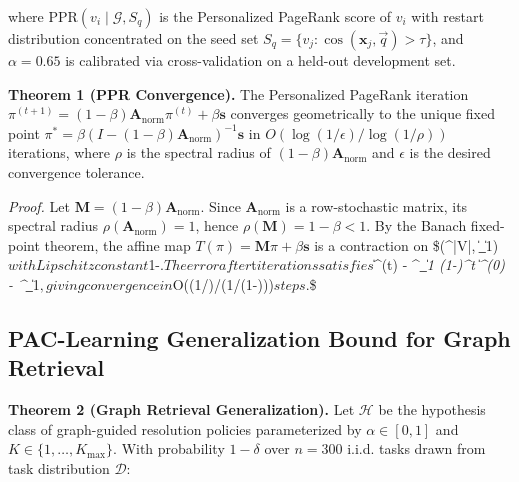\documentclass[10pt,journal,compsoc,twocolumn]{IEEEtran}
\begin{document}
where $\text{PPR}(v_i \mid \mathcal{G}, S_q)$ is the Personalized PageRank score of $v_i$ with restart distribution concentrated on the seed set $S_q = \{v_j : \cos(\mathbf{x}_j, \vec{q}) > \tau\}$, and $\alpha = 0.65$ is calibrated via cross-validation on a held-out development set.

\textbf{Theorem 1 (PPR Convergence).} The Personalized PageRank iteration $\pi^{(t+1)} = (1-\beta) \mathbf{A}_{\text{norm}} \pi^{(t)} + \beta \mathbf{s}$ converges geometrically to the unique fixed point $\pi^* = \beta(I - (1-\beta)\mathbf{A}_{\text{norm}})^{-1}\mathbf{s}$ in $O(\log(1/\epsilon) / \log(1/\rho))$ iterations, where $\rho$ is the spectral radius of $(1-\beta)\mathbf{A}_{\text{norm}}$ and $\epsilon$ is the desired convergence tolerance.

\textit{Proof.} Let $\mathbf{M} = (1-\beta)\mathbf{A}_{\text{norm}}$. Since $\mathbf{A}_{\text{norm}}$ is a row-stochastic matrix, its spectral radius $\rho(\mathbf{A}_{\text{norm}}) = 1$, hence $\rho(\mathbf{M}) = 1-\beta < 1$. By the Banach fixed-point theorem, the affine map $T(\pi) = \mathbf{M}\pi + \beta\mathbf{s}$ is a contraction on \$(^{|V|}, \|\cdot\|\_1)$ with Lipschitz constant $1-\beta$. The error after $t$ iterations satisfies $\|\pi^{(t)} - \pi^\textit{\|\_1 \leq (1-\beta)^t \|\pi^{(0)} - \pi^}\|\_1$, giving convergence in $O(\log(1/\epsilon)/\log(1/(1-\beta)))$ steps. $\square\$


\subsection{PAC-Learning Generalization Bound for Graph Retrieval}


\textbf{Theorem 2 (Graph Retrieval Generalization).} Let $\mathcal{H}$ be the hypothesis class of graph-guided resolution policies parameterized by $\alpha \in [0,1]$ and $K \in \{1,\ldots,K_{\max}\}$. With probability $1-\delta$ over $n = 300$ i.i.d. tasks drawn from task distribution $\mathcal{D}$:
\end{document}
